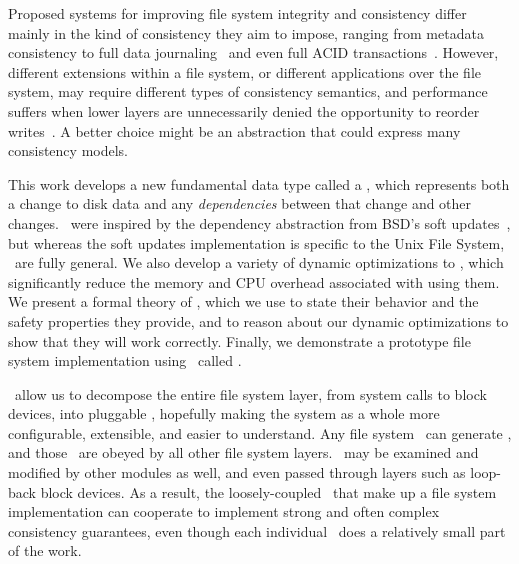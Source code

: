 Proposed systems for improving file system integrity and consistency differ
 mainly in the kind of consistency they aim to impose, ranging from
 metadata consistency to full data journaling~\cite{tweedie98journaling}
  and even full ACID
 transactions~\cite{gal05transactional,liskov04transactional}.
%
However, different extensions within a file system, or different
 applications over the file system, may require different types of
 consistency semantics, and performance suffers when lower layers are
 unnecessarily denied the opportunity to reorder
 writes~\cite{ganger00soft}.
%
A better choice might be an abstraction that could express many consistency
 models.


This work develops a new fundamental data type called a \emph{\chdesc},
 which represents both a change to disk data and any \emph{dependencies}
 between that change and other changes. 
%
\Chdescs\ were inspired by the dependency abstraction from BSD's
 soft updates~\cite{ganger00soft}, but whereas the soft updates implementation
 is specific to the Unix File System, \chdescs\ are fully general.
%
We also develop a variety of dynamic optimizations to \chdescs, which
 significantly reduce the memory and CPU overhead associated with using them.
%
We present a formal theory of \chdescs, which we use to state their
 behavior and the safety properties they provide, and to reason about our
 dynamic optimizations to show that they will work correctly.
%
Finally, we demonstrate a prototype file system implementation using
 \chdescs\ called \Kudos.


\Chdescs\ allow us to decompose the entire file system layer, from system
 calls to block devices, into pluggable \modules, hopefully making the
 system as a whole more configurable, extensible, and easier to understand.
%
Any file system \module\ can generate \chdescs, and those \chdescs\ are obeyed
 by all other file system layers.
%
\Chdescs\ may be examined and modified by other modules as well, and
 even passed through layers such as loop-back block devices.
%
As a result, the loosely-coupled \modules\ that make up a file system
 implementation can cooperate to implement strong and often complex
 consistency guarantees, even though each individual \module\ does a
 relatively small part of the work.


